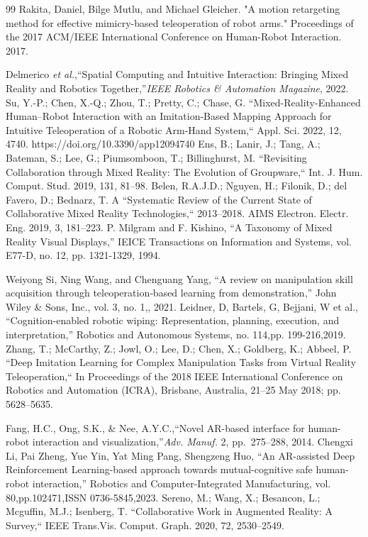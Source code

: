 \begin{thebibliography}{99}
Rakita, Daniel, Bilge Mutlu, and Michael Gleicher. "A motion retargeting method for effective mimicry-based teleoperation of robot arms." Proceedings of the 2017 ACM/IEEE International Conference on Human-Robot Interaction. 2017.



Delmerico \textit{et al.},``Spatial Computing and Intuitive Interaction: Bringing Mixed Reality and Robotics Together,''\textit{IEEE Robotics \& Automation Magazine}, 2022.
Su, Y.-P.; Chen, X.-Q.; Zhou, T.; Pretty, C.; Chase, G. ``Mixed-Reality-Enhanced Human–Robot Interaction with an Imitation-Based Mapping Approach for Intuitive Teleoperation of a Robotic Arm-Hand System,`` Appl. Sci. 2022, 12, 4740. https://doi.org/10.3390/app12094740
Ens, B.; Lanir, J.; Tang, A.; Bateman, S.; Lee, G.; Piumsomboon, T.; Billinghurst, M. ``Revisiting Collaboration through Mixed Reality: The Evolution of Groupware,`` Int. J. Hum. Comput. Stud. 2019, 131, 81–98. 
Belen, R.A.J.D.; Nguyen, H.; Filonik, D.; del Favero, D.; Bednarz, T. A ``Systematic Review of the Current State of Collaborative Mixed Reality Technologies,`` 2013–2018. AIMS Electron. Electr. Eng. 2019, 3, 181–223.
P. Milgram and F. Kishino, ``A Taxonomy of Mixed Reality Visual Displays,'' IEICE Transactions on Information and Systems, vol. E77-D, no. 12, pp. 1321-1329, 1994.



Weiyong Si, Ning Wang, and Chenguang Yang, ``A review on manipulation skill acquisition through teleoperation‐based learning from demonstration,'' John Wiley \& Sons, Inc., vol. 3, no. 1,, 2021.
Leidner, D, Bartels, G, Bejjani, W et al., ``Cognition-enabled robotic wiping: Representation, planning, execution, and interpretation,'' Robotics and Autonomous Systems,  no. 114,pp. 199-216,2019.
Zhang, T.; McCarthy, Z.; Jowl, O.; Lee, D.; Chen, X.; Goldberg, K.; Abbeel, P. ``Deep Imitation Learning for Complex Manipulation
 Tasks from Virtual Reality Teleoperation,`` In Proceedings of the 2018 IEEE International Conference on Robotics and Automation
 (ICRA), Brisbane, Australia, 21–25 May 2018; pp. 5628–5635.

Fang, H.C., Ong, S.K., \& Nee, A.Y.C.,``Novel AR-based interface for human-robot interaction and visualization,''\textit{Adv. Manuf.} 2, pp.~275--288, 2014.
Chengxi Li, Pai Zheng, Yue Yin, Yat Ming Pang, Shengzeng Huo, ``An AR-assisted Deep Reinforcement Learning-based approach towards mutual-cognitive safe human-robot interaction,'' Robotics and Computer-Integrated Manufacturing,  vol. 80,pp.102471,ISSN 0736-5845,2023.
Sereno, M.; Wang, X.; Besancon, L.; Mcguffin, M.J.; Isenberg, T. ``Collaborative Work in Augmented Reality: A Survey,`` IEEE Trans.Vis. Comput. Graph. 2020, 72, 2530–2549.


\end{thebibliography}

